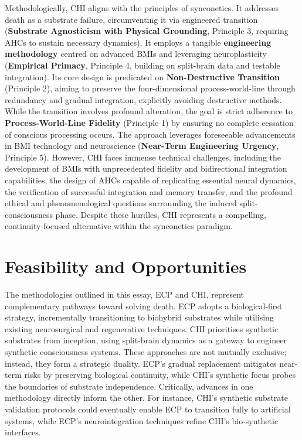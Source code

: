 \documentclass[10pt]{article}
\begin{document}
\begin{sloppypar}
  Methodologically, CHI aligns with the principles of synconetics. It addresses death as a substrate failure, circumventing it via engineered transition (\textbf{Substrate Agnosticism with Physical Grounding}, Principle 3, requiring AHCs to sustain necessary dynamics). It employs a tangible \textbf{engineering methodology} centred on advanced BMIs and leveraging neuroplasticity (\textbf{Empirical Primacy}, Principle 4, building on split-brain data and testable integration). Its core design is predicated on \textbf{Non-Destructive Transition} (Principle 2), aiming to preserve the four-dimensional process-world-line through redundancy and gradual integration, explicitly avoiding destructive methods. While the transition involves profound alteration, the goal is strict adherence to \textbf{Process-World-Line Fidelity} (Principle 1) by ensuring no complete cessation of conscious processing occurs. The approach leverages foreseeable advancements in BMI technology and neuroscience (\textbf{Near-Term Engineering Urgency}, Principle 5). However, CHI faces immense technical challenges, including the development of BMIs with unprecedented fidelity and bidirectional integration capabilities, the design of AHCs capable of replicating essential neural dynamics, the verification of successful integration and memory transfer, and the profound ethical and phenomenological questions surrounding the induced split-consciousness phase. Despite these hurdles, CHI represents a compelling, continuity-focused alternative within the synconetics paradigm.


  \section{Feasibility and Opportunities}
  \label{sec:feasibility}

  The methodologies outlined in this essay, ECP and CHI, represent complementary pathways toward solving death. ECP adopts a biological-first strategy, incrementally transitioning to biohybrid substrates while utilising existing neurosurgical and regenerative techniques. CHI prioritises synthetic substrates from inception, using split-brain dynamics as a gateway to engineer synthetic consciousness systems. These approaches are not mutually exclusive; instead, they form a strategic duality. ECP’s gradual replacement mitigates near-term risks by preserving biological continuity, while CHI’s synthetic focus probes the boundaries of substrate independence. Critically, advances in one methodology directly inform the other. For instance, CHI’s synthetic substrate validation protocols could eventually enable ECP to transition fully to artificial systems, while ECP’s neurointegration techniques refine CHI’s bio-synthetic interfaces.


\end{sloppypar}
\end{document}
